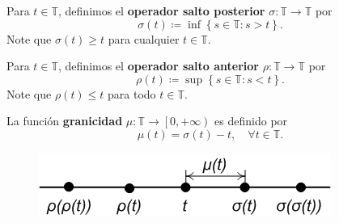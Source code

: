 \begin{frame}

\begin{definition}
Para $t\in\mathds{T}$, definimos el \textbf{operador salto posterior} $\sigma\colon\mathds{T}\rightarrow\mathds{T}$ por \[ \sigma\left(t\right)\coloneqq\inf\left\{s\in\mathds{T}:s>t\right\}. \] Note que $\sigma\left(t\right)\geq t$ para cualquier $t\in\mathds{T}$.
	\end{definition}

\begin{definition}
Para $t\in\mathds{T}$, definimos el \textbf{operador salto anterior} $\rho\colon\mathds{T}\rightarrow\mathds{T}$ por \[ \rho\left(t\right)\coloneqq\sup\left\{s\in\mathds{T}:s<t\right\}. \] Note que $\rho\left(t\right)\leq t$ para todo $t\in\mathds{T}$.
\end{definition}

\begin{definition}
La función \textbf{granicidad} $\mu\colon\mathds{T}\rightarrow\left[0,+\infty\right)$ es definido por \[ \mu\left(t\right)=\sigma\left(t\right)-t,\quad\forall t\in\mathds{T}. \]
\end{definition}
\begin{figure}[H]
	\centering
	\includegraphics[width=0.4\paperwidth]{operators}
\end{figure}
\end{frame}

